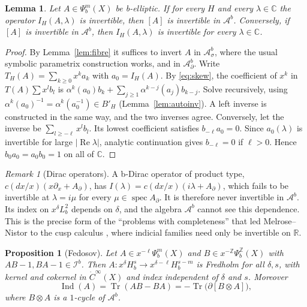 \documentclass[11pt,oneside,reqno]{article}
\newcommand{\C}{\mathbb C}
\newcommand{\Z}{\mathbb Z}
\DeclareMathOperator{\Tr}{Tr}
\newcommand{\Ib}{\mathcal I^b}
\newcommand{\Ab}{\mathcal A^b}
\newcommand{\Asb}{\mathcal A^b_\sigma}
\newcommand{\Adb}{\mathcal A^b_\partial}
\theoremstyle{plain}
\newtheorem{proposition}[theorem]{Proposition}
\newtheorem{lemma}[theorem]{Lemma}
\theoremstyle{definition}
\theoremstyle{remark}
\newtheorem{remark}[theorem]{Remark}
\begin{document}
\begin{lemma}\label{lem:invertible}
Let \(A\in\Psi_b^m(X)\) be b-elliptic. If for every \(H\) and every
\(\lambda\in\C\) the operator \(I_H(A,\lambda)\) is invertible, then
\([A]\) is invertible in \(\Ab\).
Conversely, if \([A]\) is invertible in \(\Ab\), then \(I_H(A,\lambda)\) is
invertible for every \(\lambda\in\C\).
\end{lemma}

\begin{proof}
By Lemma~\ref{lem:fibre} it suffices to invert \(A\) in \(\Asb\), where the
usual symbolic parametrix construction works, and in \(\Adb\). Write
\(T_H(A)=\sum_{k\geq0}x^ka_k\) with \(a_0=I_H(A)\). By \eqref{eq:skew}, the
coefficient of \(x^k\) in \(T(A)\sum x^lb_l\) is
\(\alpha^k(a_0)b_k+\sum_{j\geq1}\alpha^{k-j}(a_j)b_{k-j}\). Solve recursively,
using \(\alpha^k(a_0)^{-1}=\alpha^k(a_0^{-1})\in B'_H\)
(Lemma~\ref{lem:autoinv}). A left inverse is
constructed in the same way, and the two inverses agree. Conversely, let
the inverse be \(\sum_{l\geq-\ell}x^lb_l\). Its lowest coefficient
satisfies \(b_{-\ell}a_0=0\). Since \(a_0(\lambda)\) is invertible for large
\(|\operatorname{Re}\lambda|\), analytic continuation gives
\(b_{-\ell}=0\) if \(\ell>0\). Hence \(b_0a_0=a_0b_0=1\) on all of \(\C\).
\end{proof}

\begin{remark}[Dirac operators]
A b-Dirac operator of product type, \(c(dx/x)(x\partial_x+A_\partial)\), has
\(I(\lambda)=c(dx/x)(i\lambda+A_\partial)\), which fails to be invertible at
\(\lambda=i\mu\) for every \(\mu\in\operatorname{spec}A_\partial\). It is
therefore never invertible in \(\Ab\). Its index on \(x^\delta L^2_b\) depends
on \(\delta\), and the algebra \(\Ab\) cannot see this dependence. This is
the precise form of the ``problems with completeness'' that led
Melrose--Nistor to the cusp calculus \cite[p.~3]{MN}, where indicial
families need only be invertible on \(\mathbb R\).
\end{remark}

\begin{proposition}[Fedosov]\label{prop:fedosov}
Let \(A\in x^{-\ell}\Psi_b^m(X)\) and \(B\in x^{-\Z}\Psi_b^{\Z}(X)\) with
\(AB-1,BA-1\in\Ib\). Then
\(A:x^\delta H^s_b\to x^{\delta-\ell}H^{s-m}_b\) is Fredholm for all
\(\delta,s\), with kernel and cokernel in \(\dot C^\infty(X)\) and index
independent of \(\delta\) and \(s\). Moreover
\[
 \operatorname{Ind}(A)=\Tr(AB-BA)=-\Tr\bigl(\partial[B\otimes A]\bigr),
\]
where \(B\otimes A\) is a \(1\)-cycle of \(\Ab\).
\end{proposition}
\end{document}
